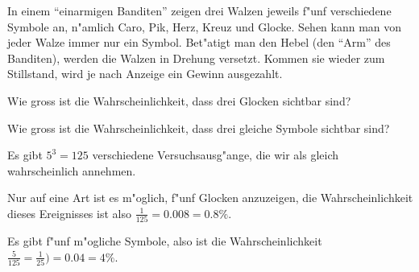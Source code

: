 In einem ``einarmigen Banditen'' zeigen drei Walzen jeweils f"unf
verschiedene Symbole an, n"amlich Caro, Pik, Herz, Kreuz und Glocke.
Sehen kann man von jeder Walze immer nur ein Symbol.
Bet"atigt man den Hebel (den ``Arm'' des Banditen),
werden die Walzen in Drehung versetzt. Kommen sie wieder zum Stillstand,
wird je nach Anzeige ein Gewinn ausgezahlt.
\begin{teilaufgaben}
\item
Wie gross ist die Wahrscheinlichkeit, dass drei Glocken sichtbar sind?
\item
Wie gross ist die Wahrscheinlichkeit, dass drei gleiche Symbole
sichtbar sind?
\end{teilaufgaben}

\begin{loesung}
Es gibt $5^3=125$ verschiedene Versuchsausg"ange, die wir als gleich
wahrscheinlich annehmen.
\begin{teilaufgaben}
\item Nur auf eine Art ist es m"oglich, f"unf Glocken anzuzeigen, die
Wahrscheinlichkeit dieses Ereignisses ist also $\frac1{125}=0.008=0.8\%$.
\item Es gibt f"unf m"ogliche Symbole, also ist die Wahrscheinlichkeit
$\frac{5}{125}=\frac1{25})=0.04=4\%$.
\qedhere
\end{teilaufgaben}
\end{loesung}

